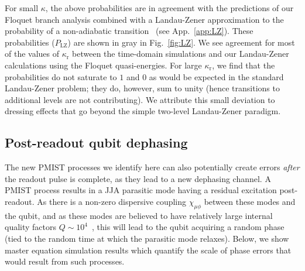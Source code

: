 \documentclass[%
reprint,
superscriptaddress,
 amsmath,amssymb,
 aps,
 prx,
longbibliography,
floatfix,
]{revtex4-2}
\begin{document}
For small $\kappa$, the above probabilities are in agreement with the predictions of our Floquet branch analysis combined with a Landau-Zener approximation to the probability of a non-adiabatic transition~\cite{ikeda2022floquet,dumas2024unified} (see App.~\ref{app:LZ}). These probabilities ($P_{\mathrm{LZ}}$) are shown in gray in Fig.~\ref{fig:LZ}. We see agreement for most of the values of $\kappa_\textrm{r}$ between the time-domain simulations and our Landau-Zener calculations using the Floquet quasi-energies. For large $\kappa_\textrm{r}$, we find that the probabilities do not saturate to $1$ and $0$ as would be expected in the standard Landau-Zener problem; they do, however, sum to unity (hence transitions to additional levels are not contributing). We attribute this small deviation to dressing effects that go beyond the simple two-level Landau-Zener paradigm.

\subsection{Post-readout qubit dephasing}\label{sec:dephasing}

The new PMIST processes we identify here can also potentially create errors \textit{after} the readout pulse is complete, as they lead to a new dephasing channel. A PMIST process results in a JJA parasitic mode having a residual excitation post-readout. As there is a non-zero dispersive coupling $\chi_{\mu \phi}$ between these modes and the qubit, and as these modes are believed to have relatively large internal quality factors $Q\sim 10^{4}$~\cite{masluk_microwave_2012, masluk2013reducing}, this will lead to the qubit acquiring a random phase (tied to the random time at which the parasitic mode relaxes). Below, we show master equation simulation results which quantify the scale of phase errors that would result from such processes.
\end{document}
